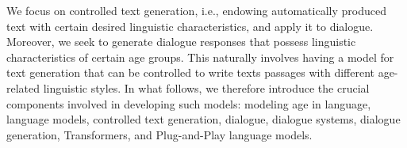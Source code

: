 


We focus on controlled text generation, i.e., endowing automatically produced text with certain desired linguistic characteristics, and apply it to dialogue. Moreover, we seek to generate dialogue responses that possess linguistic characteristics of certain age groups. This naturally involves having a model for text generation that can be controlled to write texts passages with different age-related linguistic styles. In what follows, we therefore introduce the crucial components involved in developing such models: modeling age in language, language models, controlled text generation, dialogue, dialogue systems, dialogue generation, Transformers, and Plug-and-Play language models.


